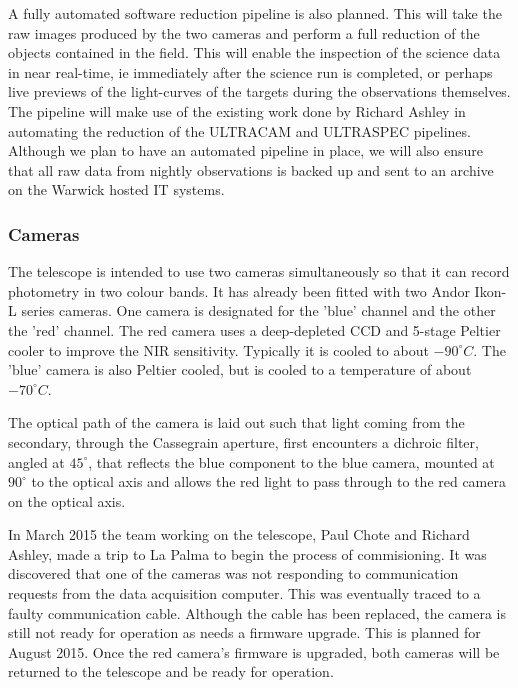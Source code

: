 \documentclass[a4paper,fleqn,usenatbib]{mnras}
\begin{document}
A fully automated software reduction pipeline is also planned. This will take the raw images produced by the two cameras and perform a full reduction of the objects contained in the field. This will enable the inspection of the science data in near real-time, ie immediately after the science run is completed, or perhaps live previews of the light-curves of the targets during the observations themselves. The pipeline will make use of the existing work done by Richard Ashley in automating the reduction of the ULTRACAM and ULTRASPEC pipelines. Although we plan to have an automated pipeline in place, we will also ensure that all raw data from nightly observations is backed up and sent to an archive on the Warwick hosted IT systems. 

\subsubsection{Cameras}
The telescope is intended to use two cameras simultaneously so that it can record photometry in two colour bands. It has already been fitted with two Andor Ikon-L series cameras. One camera is designated for the 'blue' channel and the other the 'red' channel. The red camera uses a deep-depleted CCD and 5-stage Peltier cooler to improve the NIR sensitivity. Typically it is cooled to about $-90^\circ C$. The 'blue' camera is also Peltier cooled, but is cooled to a temperature of about $-70^\circ C$.  

The optical path of the camera is laid out such that light coming from the secondary, through the Cassegrain aperture, first encounters a dichroic filter, angled at $45^\circ$, that reflects the blue component to the blue camera, mounted at $90^\circ$ to the optical axis and allows the red light to pass through to the red camera on the optical axis. 

In March 2015 the team working on the telescope, Paul Chote and Richard Ashley, made a trip to La Palma to begin the process of commisioning. It was discovered that one of the cameras was not responding to communication requests from the data acquisition computer. This was eventually traced to a faulty communication cable. Although the cable has been replaced, the camera is still not ready for operation as needs a firmware upgrade. This is planned for August 2015. Once the red camera's firmware is upgraded, both cameras will be returned to the telescope and be ready for operation. 
\end{document}

